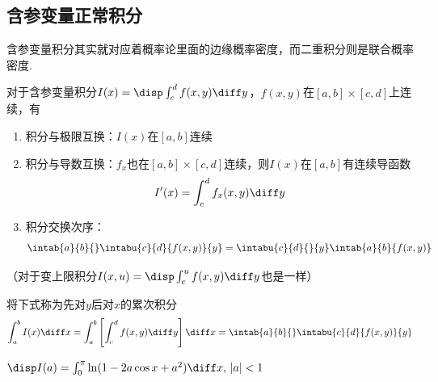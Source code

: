 \subsection{含参变量正常积分}
含参变量积分其实就对应着概率论里面的边缘概率密度，而二重积分则是联合概率密度.
\begin{theorem}
\label{thm:parameter_normal_integral}
对于含参变量积分$I(x)=\disp\int_c^df(x,y)\diff y$，$f(x,y)$在$[a,b]\times [c,d]$上连续，有
\begin{enumerate}
	\item 积分与极限互换：$I(x)$在$[a,b]$连续
	\item 积分与导数互换：$f_x$也在$[a,b]\times [c,d]$连续，则$I(x)$在$[a,b]$有连续导函数
	\[I'(x)=\int_c^df_x(x,y)\diff y\]
	\item 积分交换次序：
	\[\intab{a}{b}{}\intabu{c}{d}{f(x,y)}{y}=\intabu{c}{d}{}{y}\intab{a}{b}{f(x,y)}\]
\end{enumerate}
（对于变上限积分$I(x,u)=\disp\int_c^uf(x,y)\diff y$也是一样）
\end{theorem}
\par 将下式称为先对$y$后对$x$的累次积分
\[\int_a^bI(x)\diff x=\int_a^b\left[\int_c^df(x,y)\diff y\right]\diff x=\intab{a}{b}{}\intabu{c}{d}{f(x,y)}{y}\]
\begin{example}
$\disp I(a)=\int_0^\pi\ln(1-2a\cos x+a^2)\diff x,\,|a|<1$
\end{example}
